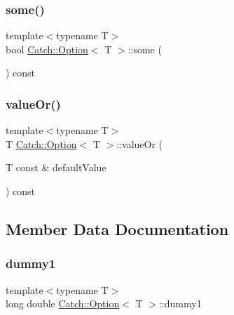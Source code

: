 \mbox{\label{class_catch_1_1_option_a97c95829afbe92f2bcc5fd75b32c0825}} 
\subsubsection{\texorpdfstring{some()}{some()}}
{\footnotesize\ttfamily template$<$typename T$>$ \\
bool \hyperlink{class_catch_1_1_option}{Catch\+::\+Option}$<$ T $>$\+::some (\begin{DoxyParamCaption}{ }\end{DoxyParamCaption}) const\hspace{0.3cm}{\ttfamily [inline]}}

\mbox{\label{class_catch_1_1_option_a8d9ae2e30b0eb76fe134a6fbc8423124}} 
\subsubsection{\texorpdfstring{value\+Or()}{valueOr()}}
{\footnotesize\ttfamily template$<$typename T$>$ \\
T \hyperlink{class_catch_1_1_option}{Catch\+::\+Option}$<$ T $>$\+::value\+Or (\begin{DoxyParamCaption}\item[{T const \&}]{default\+Value }\end{DoxyParamCaption}) const\hspace{0.3cm}{\ttfamily [inline]}}



\subsection{Member Data Documentation}
\mbox{\label{class_catch_1_1_option_a48ef08179923d6f943abe614999e6073}} 
\subsubsection{\texorpdfstring{dummy1}{dummy1}}
{\footnotesize\ttfamily template$<$typename T$>$ \\
long double \hyperlink{class_catch_1_1_option}{Catch\+::\+Option}$<$ T $>$\+::dummy1}

